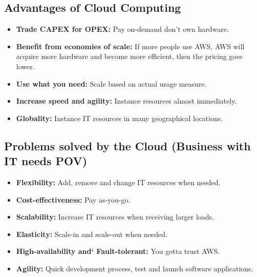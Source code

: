 \subsection{Advantages of Cloud Computing}

\begin{itemize}
	\item \textbf{Trade CAPEX for OPEX:} Pay on-demand don't own hardware.
	\item \textbf{Benefit from economies of scale:} If more people use AWS, AWS will acquire more hardware and become more efficient, then the pricing goes lower.
	\item \textbf{Use what you need:} Scale based on actual usage measure.
	\item \textbf{Increase speed and agility:} Instance resources almost immediately.
	\item \textbf{Globality:} Instance IT resources in many geographical locations.
\end{itemize}

\subsection{Problems solved by the Cloud (Business with IT needs POV)}
\begin{itemize}
	\item \textbf{Flexibility:} Add, remove and change IT resources when needed.
	\item \textbf{Cost-effectiveness:} Pay as-you-go.
	\item \textbf{Scalability:} Increase IT resources when receiving larger loads.
	\item \textbf{Elasticity:} Scale-in and scale-out when needed.
	\item \textbf{High-availability and` Fault-tolerant:} You gotta trust AWS.
	\item \textbf{Agility:} Quick development process, test and launch software applications.
\end{itemize}

